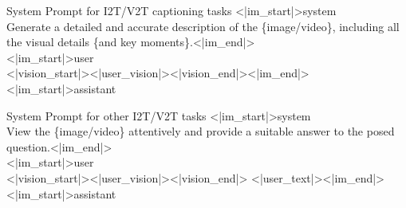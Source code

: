 \documentclass{llmxive}
\begin{document}
\begin{minipage}{\textwidth}
\centering
\small


\begin{promptfigbox}{System Prompt for I2T/V2T captioning tasks}
{\ttfamily
\textless|im\_start|\textgreater system\\[1pt]
Generate a detailed and accurate description of the \{{image}/{{video}}\}, including all the visual details {{\{and key moments\}}}.\textless|im\_end|\textgreater\\[1pt]
\textless|im\_start|\textgreater user\\[1pt]
\textless|vision\_start|\textgreater {{\textless|user\_vision|\textgreater}}\textless|vision\_end|\textgreater\textless|im\_end|\textgreater\\[1pt]
\textless|im\_start|\textgreater assistant
}
\end{promptfigbox}

\vspace{-0.3em}

\begin{promptfigbox}{System Prompt for other I2T/V2T tasks}
{\ttfamily
\textless|im\_start|\textgreater system\\[1pt]
View the \{{{image}}/{{video}}\} attentively and provide a suitable answer to the posed question.\textless|im\_end|\textgreater\\[1pt]
\textless|im\_start|\textgreater user\\[1pt]
\textless|vision\_start|\textgreater {{\textless|user\_vision|\textgreater}}\textless|vision\_end|\textgreater
{{\textless|user\_text|\textgreater}}\textless|im\_end|\textgreater\\[1pt]
\textless|im\_start|\textgreater assistant
}
\end{promptfigbox}

\vspace{-0.5em}

\label{fig:prompt-und}

\end{minipage}
\end{document}
